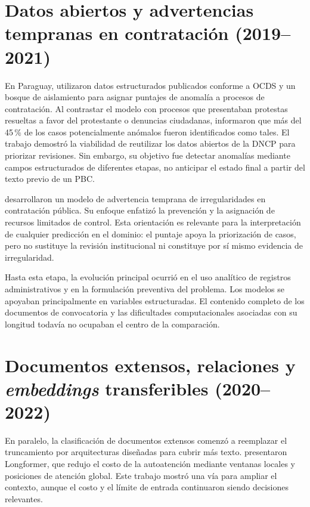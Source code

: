 \section{Datos abiertos y advertencias tempranas en contratación (2019--2021)}

En Paraguay, \textcite{kehler2019anomaly} utilizaron datos estructurados publicados conforme a OCDS y un bosque de aislamiento para asignar puntajes de anomalía a procesos de contratación. Al contrastar el modelo con procesos que presentaban protestas resueltas a favor del protestante o denuncias ciudadanas, informaron que más del 45\,\% de los casos potencialmente anómalos fueron identificados como tales. El trabajo demostró la viabilidad de reutilizar los datos abiertos de la DNCP para priorizar revisiones. Sin embargo, su objetivo fue detectar anomalías mediante campos estructurados de diferentes etapas, no anticipar el estado final a partir del texto previo de un PBC.

\textcite{gallego2021earlywarning} desarrollaron un modelo de advertencia temprana de irregularidades en contratación pública. Su enfoque enfatizó la prevención y la asignación de recursos limitados de control. Esta orientación es relevante para la interpretación de cualquier predicción en el dominio: el puntaje apoya la priorización de casos, pero no sustituye la revisión institucional ni constituye por sí mismo evidencia de irregularidad.

Hasta esta etapa, la evolución principal ocurrió en el uso analítico de registros administrativos y en la formulación preventiva del problema. Los modelos se apoyaban principalmente en variables estructuradas. El contenido completo de los documentos de convocatoria y las dificultades computacionales asociadas con su longitud todavía no ocupaban el centro de la comparación.

\section{Documentos extensos, relaciones y \textit{embeddings} transferibles (2020--2022)}

En paralelo, la clasificación de documentos extensos comenzó a reemplazar el truncamiento por arquitecturas diseñadas para cubrir más texto. \textcite{beltagy2020longformer} presentaron Longformer, que redujo el costo de la autoatención mediante ventanas locales y posiciones de atención global. Este trabajo mostró una vía para ampliar el contexto, aunque el costo y el límite de entrada continuaron siendo decisiones relevantes.

